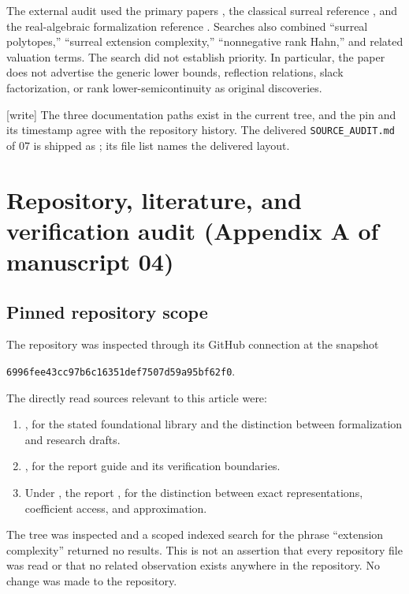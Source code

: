 \documentclass[11pt,a4paper]{article}
\numberwithin{equation}{section}
\theoremstyle{plain}
\newcommand{\wtag}{\textup{[write]}}%
\newcommand{\repocommit}{6996fee43cc97b6c16351def7507d59a95bf62f0}
\begin{document}
The external audit used the primary papers \cite{ic:frt,ic:kp,ic:grt,ic:gpt,ic:psdrank},
the classical surreal reference \cite{ic:gonshor}, and the real-algebraic
formalization reference \cite{ic:cohenmahboubi}. Searches also combined
``surreal polytopes,'' ``surreal extension complexity,'' ``nonnegative
rank Hahn,'' and related valuation terms. The search did not establish
priority. In particular, the paper does not advertise the generic
lower bounds, reflection relations, slack factorization, or rank
lower-semicontinuity as original discoveries.

\wtag{} The three documentation paths exist in the current tree, and the
pin and its timestamp agree with the repository history. The delivered
\texttt{SOURCE\_AUDIT.md} of 07 is shipped as
; its file list names the
delivered layout.

\section{Repository, literature, and verification audit (Appendix A of manuscript 04)}\label{poly:bao:sec:audit}

\subsection{Pinned repository scope}
The repository was inspected through its GitHub connection at the
snapshot
\begin{center}
\texttt{\repocommit}.
\end{center}
The directly read sources relevant to this article were:
\begin{enumerate}[label=\arabic*.]
\item {}, for the stated foundational
library and the distinction between formalization and research drafts.
\item {}, for the report guide
and its verification boundaries.
\item Under , the report
,
for the distinction between exact representations, coefficient access,
and approximation.
\end{enumerate}
The tree was inspected and a scoped indexed search for the phrase
``extension complexity'' returned no results. This is not an assertion
that every repository file was read or that no related observation
exists anywhere in the repository. No change was made to the repository.
\end{document}
